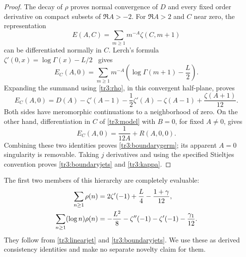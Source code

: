 \documentclass[11pt]{article}
\numberwithin{equation}{section}
\theoremstyle{plain}
\theoremstyle{definition}
\theoremstyle{remark}
\begin{document}
\begin{proof}
The decay of $\rho$ proves normal convergence of $D$ and every fixed
order derivative on compact subsets of $\Re A>-2$.  For $\Re A>2$
and $C$ near zero, the representation
\[
 E(A,C)=\sum_{m\geq1}m^{-A}\zeta(C,m+1)
\]
can be differentiated normally in $C$.  Lerch's formula
$\zeta'(0,x)=\log\Gamma(x)-L/2$~\cite[(25.11.18)]{tr3:DLMF} gives
\[
 E_C(A,0)=\sum_{m\geq1}m^{-A}
            \left(\log\Gamma(m+1)-\frac L2\right).
\]
Expanding the summand using \eqref{tr3:rho}, in this convergent
half-plane, proves
\[
 E_C(A,0)=D(A)-\zeta'(A-1)-\frac12\zeta'(A)
          -\zeta(A-1)+\frac{\zeta(A+1)}{12}.
\]
Both sides have meromorphic continuations to a neighborhood of zero.
On the other hand, differentiation in $C$ of \eqref{tr3:model} with
$B=0$, for fixed $A\ne0$, gives
\[
 E_C(A,0)=\frac{1}{12A}+R(A,0,0).
\]
Combining these two identities proves \eqref{tr3:boundarygerm}; its
apparent $A=0$ singularity is removable.  Taking $j$ derivatives and
using the specified Stieltjes convention proves
\eqref{tr3:boundaryjets} and \eqref{tr3:kappa}.
\end{proof}

The first two members of this hierarchy are completely evaluable:
\begin{align}\label{tr3:lowGamma}
 \sum_{n\geq1}\rho(n)
   &=2\zeta'(-1)+\frac L4-\frac{1+\gamma}{12},\notag\\
 \sum_{n\geq1}(\log n)\rho(n)
   &=-\frac{L^2}{8}-\zeta''(-1)-\zeta'(-1)-\frac{\gamma_1}{12}.
\end{align}
They follow from \eqref{tr3:linearjet} and
\eqref{tr3:boundaryjets}.  We use these as derived consistency
identities and make no separate novelty claim for them.
\end{document}
